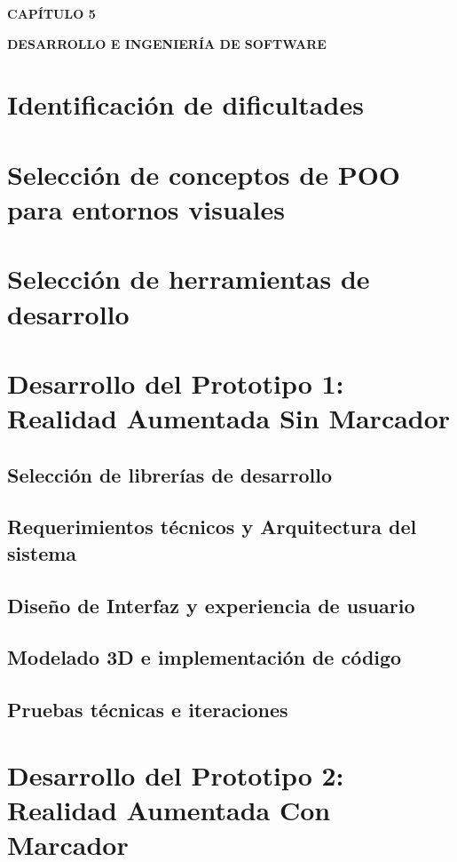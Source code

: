 \setcounter{chapter}{5}
\setcounter{section}{0} 
{\centering
{\large\bfseries CAPÍTULO 5}\par\vspace{0.3cm}
{\Large\bfseries DESARROLLO E INGENIERÍA DE SOFTWARE}\par}
\vspace{1cm}

\section{Identificación de dificultades}
\section{Selección de conceptos de POO para entornos visuales}
\section{Selección de herramientas de desarrollo}
\section{Desarrollo del Prototipo 1: Realidad Aumentada Sin Marcador}
\subsection{Selección de librerías de desarrollo}
\subsection{Requerimientos técnicos y Arquitectura del sistema}
\subsection{Diseño de Interfaz y experiencia de usuario}
\subsection{Modelado 3D e implementación de código}
\subsection{Pruebas técnicas e iteraciones}
\section{Desarrollo del Prototipo 2: Realidad Aumentada Con Marcador}
